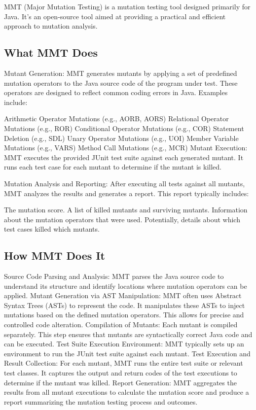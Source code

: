 \documentclass[sigplan, nonacm]{acmart}
\begin{document}
MMT (Major Mutation Testing) is a mutation testing tool designed primarily for Java. It's an
open-source tool aimed at providing a practical and efficient approach to mutation analysis.

\subsection{What MMT Does}

Mutant Generation: MMT generates mutants by applying a set of predefined mutation operators to the
Java source code of the program under test. These operators are designed to reflect common coding errors in Java. Examples include:

Arithmetic Operator Mutations (e.g., AORB, AORS)
Relational Operator Mutations (e.g., ROR)
Conditional Operator Mutations (e.g., COR)
Statement Deletion (e.g., SDL)
Unary Operator Mutations (e.g., UOI)
Member Variable Mutations (e.g., VARS)
Method Call Mutations (e.g., MCR)
Mutant Execution: MMT executes the provided JUnit test suite against each generated mutant. It runs each test case for each mutant to determine if the mutant is killed.

Mutation Analysis and Reporting: After executing all tests against all mutants, MMT analyzes the results and generates a report. This report typically includes:

The mutation score.
A list of killed mutants and surviving mutants.
Information about the mutation operators that were used.
Potentially, details about which test cases killed which mutants.
\subsection{How MMT Does It}

Source Code Parsing and Analysis: MMT parses the Java source code to understand its structure and identify locations where mutation operators can be applied.
Mutant Generation via AST Manipulation: MMT often uses Abstract Syntax Trees (ASTs) to represent the code. It manipulates these ASTs to inject mutations based on the defined mutation operators. This allows for precise and controlled code alteration.
Compilation of Mutants: Each mutant is compiled separately. This step ensures that mutants are syntactically correct Java code and can be executed.
Test Suite Execution Environment: MMT typically sets up an environment to run the JUnit test suite against each mutant.
Test Execution and Result Collection: For each mutant, MMT runs the entire test suite or relevant test classes. It captures the output and return codes of the test executions to determine if the mutant was killed.
Report Generation: MMT aggregates the results from all mutant executions to calculate the mutation score and produce a report summarizing the mutation testing process and outcomes.
\end{document}
